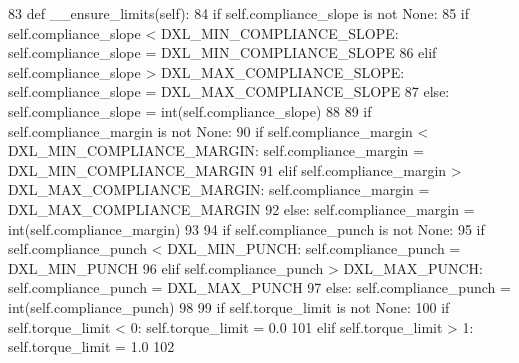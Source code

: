 \begin{DoxyCode}
83     \textcolor{keyword}{def }\_\_ensure\_limits(self):
84         \textcolor{keywordflow}{if} self.compliance\_slope \textcolor{keywordflow}{is} \textcolor{keywordflow}{not} \textcolor{keywordtype}{None}:
85             \textcolor{keywordflow}{if} self.compliance\_slope < DXL\_MIN\_COMPLIANCE\_SLOPE: self.compliance\_slope = 
      DXL\_MIN\_COMPLIANCE\_SLOPE
86             \textcolor{keywordflow}{elif} self.compliance\_slope > DXL\_MAX\_COMPLIANCE\_SLOPE: self.compliance\_slope = 
      DXL\_MAX\_COMPLIANCE\_SLOPE
87             \textcolor{keywordflow}{else}: self.compliance\_slope = int(self.compliance\_slope)
88             
89         \textcolor{keywordflow}{if} self.compliance\_margin \textcolor{keywordflow}{is} \textcolor{keywordflow}{not} \textcolor{keywordtype}{None}:
90             \textcolor{keywordflow}{if} self.compliance\_margin < DXL\_MIN\_COMPLIANCE\_MARGIN: self.compliance\_margin = 
      DXL\_MIN\_COMPLIANCE\_MARGIN
91             \textcolor{keywordflow}{elif} self.compliance\_margin > DXL\_MAX\_COMPLIANCE\_MARGIN: self.compliance\_margin = 
      DXL\_MAX\_COMPLIANCE\_MARGIN
92             \textcolor{keywordflow}{else}: self.compliance\_margin = int(self.compliance\_margin)
93             
94         \textcolor{keywordflow}{if} self.compliance\_punch \textcolor{keywordflow}{is} \textcolor{keywordflow}{not} \textcolor{keywordtype}{None}:
95             \textcolor{keywordflow}{if} self.compliance\_punch < DXL\_MIN\_PUNCH: self.compliance\_punch = DXL\_MIN\_PUNCH
96             \textcolor{keywordflow}{elif} self.compliance\_punch > DXL\_MAX\_PUNCH: self.compliance\_punch = DXL\_MAX\_PUNCH
97             \textcolor{keywordflow}{else}: self.compliance\_punch = int(self.compliance\_punch)
98             
99         \textcolor{keywordflow}{if} self.torque\_limit \textcolor{keywordflow}{is} \textcolor{keywordflow}{not} \textcolor{keywordtype}{None}:
100             \textcolor{keywordflow}{if} self.torque\_limit < 0: self.torque\_limit = 0.0
101             \textcolor{keywordflow}{elif} self.torque\_limit > 1: self.torque\_limit = 1.0
102 
\end{DoxyCode}
\mbox{\label{classdynamixel__controllers_1_1joint__controller_1_1_joint_controller_afb48c76aacd3a1cf49b7e3e412760976}} 
